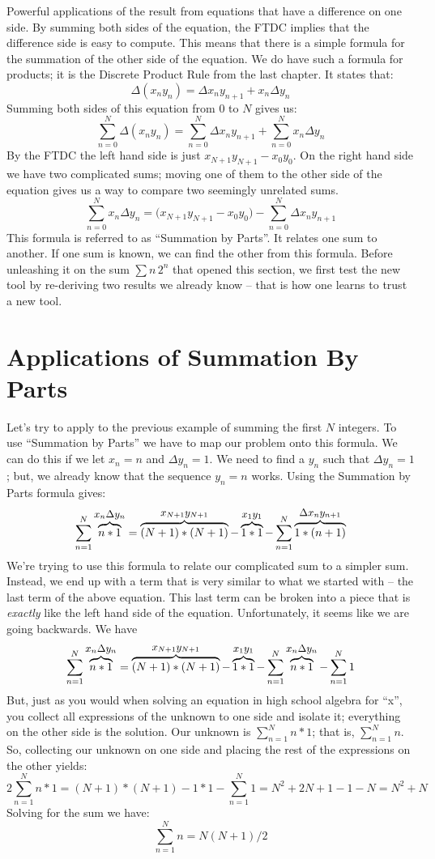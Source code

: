 Powerful applications of the  result from equations that have
a difference on one side. By summing both sides of the equation, the FTDC
implies that the difference side is easy to compute. This means that there
is a simple formula for the summation of the other side of the equation.
We do have such a formula for products; it is the
Discrete Product Rule from the last chapter. It states that:
$$
\Delta (x_n y_n) = \Delta x_n y_{n+1} + x_n \Delta y_n
$$
Summing both sides of this equation from $0$ to $N$ gives us:
$$
\sum_{n=0}^{N} \Delta (x_n y_n) = 
\sum_{n=0}^{N} \Delta x_n y_{n+1} + \sum_{n=0}^{N} x_n \Delta y_n
$$
By the FTDC the left hand side is just $x_{N+1} y_{N+1} - x_0 y_0$. On the right hand 
side we have two complicated sums; moving one of them to the other side of the equation
gives us a way to compare two seemingly unrelated sums.
$$
\sum_{n=0}^{N} x_n \Delta y_n = \bigl(x_{N+1} y_{N+1} - x_0 y_0\bigr) - 
\sum_{n=0}^{N} \Delta x_n y_{n+1}
$$
This formula is referred to as ``Summation by Parts''. It relates one sum
to another. If one sum is known, we can find the other from this formula.
Before unleashing it on the sum $\sum n \, 2^n$ that opened this section,
we first test the new tool by re-deriving two results we already know --
that is how one learns to trust a new tool.

\section{Applications of Summation By Parts}
Let's try to apply  to the previous example of 
summing the first $N$ integers. To use ``Summation by Parts'' we 
have to map our problem onto this formula. We can do this if we let 
$x_n = n$ and $\Delta y_n = 1$. We need to find a $y_n$ such that 
$\Delta y_n = 1$; but, we already know that the sequence $y_n = n$ works.  Using the
Summation by Parts formula gives:
$$
\sum_{n=1}^{N} \mathop{\overbrace{n * 1}}\limits^{\hbox{\small $x_n \Delta y_n$}} =
\mathop{\overbrace{(N+1) * (N+1)}}\limits^{\hbox{\small $x_{N+1} y_{N+1}$}} - \mathop{\overbrace{1 * 1}}\limits^{\hbox{\small $x_1 y_1$}}
- \sum_{n=1}^{N} \mathop{\overbrace{1 * (n+1)}}\limits^{\hbox{\small $\Delta x_n y_{n+1}$}}
$$
We're trying to use this formula to relate our complicated sum to
a simpler sum. Instead, we end up with a term that is very similar to what we 
started with -- the last term of the above equation. 
This last term can be broken into a piece that is {\it exactly\/} like 
the left hand side of the equation. Unfortunately, it seems like we are 
going backwards. We have
$$
\sum_{n=1}^{N} \mathop{\overbrace{n * 1}}\limits^{\hbox{\small $x_n \Delta y_n$}} =
\mathop{\overbrace{(N+1) * (N+1)}}\limits^{\hbox{\small $x_{N+1} y_{N+1}$}} - \mathop{\overbrace{1 * 1}}\limits^{\hbox{\small $x_1 y_1$}}
- \sum_{n=1}^{N} \mathop{\overbrace{n * 1}}\limits^{\hbox{\small $x_n \Delta y_n$}} -
\sum_{n=1}^N 1
$$
But, just as you would when solving an equation in high school algebra 
for ``x'', you collect all expressions of the unknown to one 
side and isolate it; 
everything on the other side is the solution. Our unknown is 
$\sum_{n=1}^{N} n * 1$; that is, $\sum_{n=1}^{N} n$. So, collecting our unknown on 
one side and placing the rest of the expressions on the other yields:
$$
2 \sum_{n=1}^{N} n * 1 = (N+1) * (N+1) - 1 * 1 - \sum_{n=1}^N 1 = 
N^2 + 2N + 1 - 1 - N = N^2 + N
$$
Solving for the sum we have:
$$
\sum_{n=1}^{N} n = N(N+1)/2
$$

